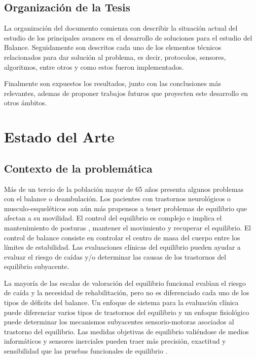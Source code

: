 \documentclass[12pt,a4paper]{article}
\begin{document}
\subsection{Organizaci\'on de la Tesis}
La organización del documento comienza con describir la situación actual del estudio de los principales avances en el desarrollo de soluciones para el estudio del Balance. Seguidamente son descritos cada uno de los elementos técnicos relacionados para dar solución al problema, es decir,  protocolos, sensores, algoritmos, entre otros y como estos fueron implementados.

Finalmente son expuestos los resultados, junto con las conclusiones más relevantes, ademas de proponer trabajos futuros que proyecten este desarrollo en otros ámbitos.


\section{Estado del Arte}

\subsection{Contexto de la problemática}
Más de un tercio de la población mayor de 65 años presenta algunos problemas con el balance o deambulación. Los pacientes con trastornos neurológicos o musculo-esqueléticos son aún más propensos a tener problemas de equilibrio que afectan a su movilidad.
El control del equilibrio es complejo e implica el mantenimiento de posturas \cite{mancini_relevance_2010}, mantener el movimiento y recuperar el equilibrio. El control de balance consiste en controlar el centro de masa del cuerpo entre los límites de estabilidad. Las evaluaciones clínicas del equilibrio pueden ayudar a evaluar el riesgo de caídas y/o determinar las causas de los trastornos del equilibrio subyacente.

La mayoría de las escalas de valoración del equilibrio funcional evalúan el riesgo de caída y la necesidad de rehabilitación, pero no es diferenciado cada uno de los tipos de déficits del balance. Un enfoque de sistema para la evaluación clínica puede diferenciar varios tipos de trastornos del equilibrio y un enfoque fisiológico puede determinar los mecanismos subyacentes sensorio-motoras asociados al trastorno del equilibrio. Las medidas objetivas de equilibrio valiéndose de medios informáticos y sensores inerciales pueden traer más precisión, exactitud y sensibilidad que las pruebas funcionales de equilibrio \cite{chaudhry_measurement_2011}.
\end{document}
